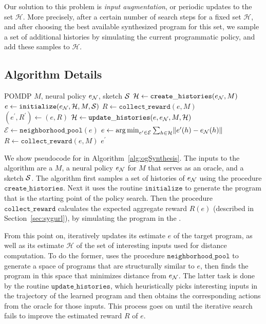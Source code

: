 Our solution to this problem is {\em input augmentation}, or periodic updates to the set $\mathcal{H}$.  More precisely, after a certain number of search steps for a fixed set $\mathcal{H}$, and after choosing the best available synthesized program for this set, we sample a set of additional histories by simulating the current programmatic policy, and add these samples to $\mathcal{H}$.

\subsection{Algorithm Details} 
\label{algodetails}


\begin{algorithm}[h]
	\caption{Neurally Directed Program Search}
	\label{alg:ogSynthesis}
{
	\begin{algorithmic}
		 POMDP $M$, neural policy $e_{\NN}$, sketch $\S$
		\STATE $ \mathcal{H} \gets \mathtt{create\_histories}(e_{\NN}, M)$
		\STATE $e \gets \mathtt{initialize}(e_{\NN}, \mathcal{H}, M, \S)$
		\STATE $R \gets  \mathtt{collect\_reward}(e, M)$
		\REPEAT
		\STATE $ (e^\prime, R^\prime) \gets (e, R) $ 
		\STATE $\mathcal{H} \gets \mathtt{update\_histories}(e, e_\NN, M, \mathcal{H})$
		\STATE $\mathcal{E} \gets \mathtt{neighborhood\_pool}(e)$
		\STATE $e \gets  \argmin_{e' \in \mathcal{E}} \sum_{h \in \mathcal{H}} \norm{e'(h) - e_\NN(h)}$ 
		\STATE $R \gets  \mathtt{collect\_reward}(e, M)$
		 $ e^\prime$		
	\end{algorithmic}
}
\end{algorithm}

We show pseudocode for \algo in Algorithm~\ref{alg:ogSynthesis}. 
The inputs to the algorithm are a \pomdp $M$, a neural policy $e_\NN$ for $M$ that serves as an oracle, and a sketch $\S$. The algorithm first samples a set of histories of $e_\NN$ using the procedure $\mathtt{create\_histories}$. Next it uses the routine $\mathtt{initialize}$ to generate the program that is the starting point of the policy search. Then the procedure $\mathtt{collect\_reward}$ calculates the expected aggregate reward $R(e)$ (described in Section~\ref{sec:sygurl}), by simulating the program in the \pomdp. 

From this point on, \algo iteratively updates its estimate $e$ of the target program, as well as its estimate $\mathcal{H}$ of the set of interesting inputs used for distance computation. To do the former, \algo uses the procedure $\mathtt{neighborhood\_pool}$ to generate a space of programs that are structurally similar to $e$, then finds the program in this space that minimizes distance from $e_\NN$. The latter task is done by the routine $\mathtt{update\_histories}$, which heuristically picks interesting inputs in the trajectory of the learned program and then obtains the corresponding actions from the oracle for those inputs. This process goes on until the iterative search fails to improve the estimated reward $R$ of $e$.

